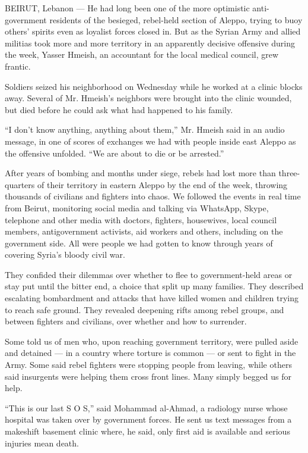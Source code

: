 BEIRUT, Lebanon --- He had long been one of the more optimistic
anti-government residents of the besieged, rebel-held section of Aleppo,
trying to buoy others' spirits even as loyalist forces closed in. But as
the Syrian Army and allied militias took more and more territory in an
apparently decisive offensive during the week, Yasser Hmeish, an
accountant for the local medical council, grew frantic.

Soldiers seized his neighborhood on Wednesday while he worked at a
clinic blocks away. Several of Mr. Hmeish's neighbors were brought into
the clinic wounded, but died before he could ask what had happened to
his family.

``I don't know anything, anything about them,'' Mr. Hmeish said in an
audio message, in one of scores of exchanges we had with people inside
east Aleppo as the offensive unfolded. ``We are about to die or be
arrested.''

After years of bombing and months under siege, rebels had lost more than
three-quarters of their territory in eastern Aleppo by the end of the
week, throwing thousands of civilians and fighters into chaos. We
followed the events in real time from Beirut, monitoring social media
and talking via WhatsApp, Skype, telephone and other media with doctors,
fighters, housewives, local council members, antigovernment activists,
aid workers and others, including on the government side. All were
people we had gotten to know through years of covering Syria's bloody
civil war.

They confided their dilemmas over whether to flee to government-held
areas or stay put until the bitter end, a choice that split up many
families. They described escalating bombardment and attacks that have
killed women and children trying to reach safe ground. They revealed
deepening rifts among rebel groups, and between fighters and civilians,
over whether and how to surrender.

Some told us of men who, upon reaching government territory, were pulled
aside and detained --- in a country where torture is common --- or sent
to fight in the Army. Some said rebel fighters were stopping people from
leaving, while others said insurgents were helping them cross front
lines. Many simply begged us for help.

``This is our last S O S,'' said Mohammad al-Ahmad, a radiology nurse
whose hospital was taken over by government forces. He sent us text
messages from a makeshift basement clinic where, he said, only first aid
is available and serious injuries mean death.

